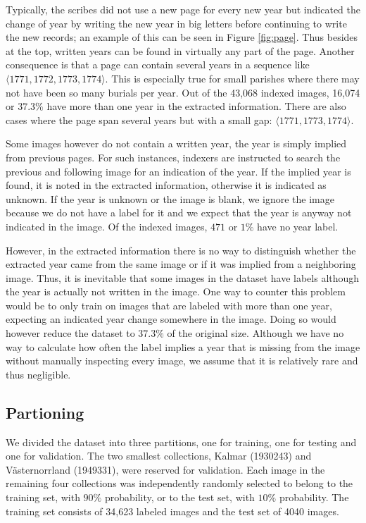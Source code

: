 Typically, the scribes did not use a new page for every new year but indicated the change of year by writing the new year in big letters before continuing to write the new records; an example of this can be seen in Figure \ref{fig:page}.
Thus besides at the top, written years can be found in virtually any part of the page. Another consequence is that a page can contain several years in a sequence like $\langle 1771, 1772, 1773, 1774 \rangle$. This is especially true for small parishes where there may not have been so many burials per year. Out of the 43,068 indexed images, 16,074 or $37.3\%$ have more than one year in the extracted information. There are also cases where the page span several years but with a small gap: $\langle 1771, 1773, 1774 \rangle$.

Some images however do not contain a written year, the year is simply implied from previous pages. For such instances, indexers are instructed to search the previous and following image for an indication of the year. If the implied year is found, it is noted in the extracted information, otherwise it is indicated as unknown.
If the year is unknown or the image is blank, we ignore the image because we do not have a label for it and we expect that the year is anyway not indicated in the image. Of the indexed images, $471$ or $1\%$ have no year label.

However, in the extracted information there is no way to distinguish whether the extracted year came from the same image or if it was implied from a neighboring image. Thus, it is inevitable that some images in the dataset have labels although the year is actually not written in the image. One way to counter this problem would be to only train on images that are labeled with more than one year, expecting an indicated year change somewhere in the image. Doing so would however reduce the dataset to $37.3\%$ of the original size.
Although we have no way to calculate how often the label implies a year that is missing from the image without manually inspecting every image, we assume that it is relatively rare and thus negligible.

\subsection{Partioning}

We divided the dataset into three partitions, one for training, one for testing and one for validation. The two smallest collections, Kalmar (1930243) and Västernorrland (1949331), were reserved for validation.
Each image in the remaining four collections was independently randomly selected to belong to the training set, with $90\%$ probability, or to the test set, with $10\%$ probability.
The training set consists of 34,623 labeled images and the test set of 4040 images.

